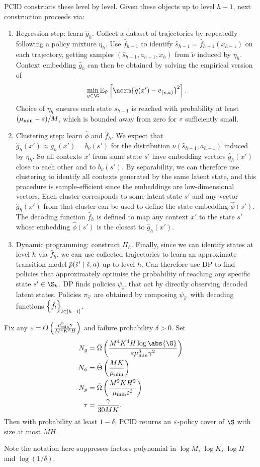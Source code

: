 \documentclass[11pt, openany]{book}
\begin{document}
PCID constructs these level by level. Given these objects up to level $h-1$, next construction proceeds via:
\begin{enumerate}
    \item Regression step: learn $\hat g_h$. Collect a dataset of trajectories by repeatedly following a policy mixture $\eta_h$. Use $\hat f_{h-1}$ to identify $\hat s_{h-1} = \hat{f}_{h-1}(x_{h-1})$ on each trajectory, getting samples $(\hat{s}_{h-1},a_{h-1},x_h)$ from $\tilde\nu$ induced by $\eta_h$. Context embedding $\hat{g}_h$ can then be obtained by solving the empirical version of
        \[
            \min_{g\in\G} \E_{\tilde\nu} \left[ \norm{g(x') - e_{(s,a)}}^2 \right].
        \]
        Choice of $\eta_h$ ensures each state $s_{h-1}$ is reached with probability at least $(\mu_{\min}-\varepsilon)/M$, which is bounded away from zero for $\varepsilon$ sufficiently small.
    \item Clustering step: learn $\hat\phi$ and $\hat f_h$. We expect that $\hat g_h(x')\approx g_h(x')=b_\nu(s')$ for the distribution $\nu(\hat s_{h-1},a_{h-1})$ induced by $\eta_h$. So all contexts $x'$ from same state $s'$ have embedding vectors $\hat g_h(x')$ close to each other and to $b_\nu(s')$. By separability, we can therefore use clustering to identify all contexts generated by the same latent state, and this procedure is sample-efficient since the embeddings are low-dimensional vectors. Each cluster corresponds to some latent state $s'$ and any vector $\hat g_h(x')$ from that cluster can be used to define the state embedding $\hat\phi(s')$. The decoding function $\hat f_h$ is defined to map any context $x'$ to the state $s'$ whose embedding $\hat\phi(s')$ is the closest to $\hat g_h(x')$.
    \item Dynamic programming: construct $\Pi_h$. Finally, since we can identify states at level $h$ via $\hat f_h$, we can use collected trajectories to learn an approximate transition model $\hat p(\hat{s}'\mid\hat s,a)$ up to level $h$. Can therefore use DP to find policies that approximately optimise the probability of reaching any specific state $s'\in\S_h$. DP finds policies $\psi_{\hat{s}'}$ that act by directly observing decoded latent states. Policies $\pi_{\hat{s}'}$ are obtained by composing $\psi_{\hat{s}'}$ with decoding functions $\left\lbrace\hat f_l\right\rbrace_{l\in[h-1]}$.
\end{enumerate}

\begin{theorem}
    Fix any $\varepsilon = O\left(\frac{\mu_{\min}^3 \gamma}{M^4 K^3 H}\right)$ and failure probability $\delta>0$. Set
    \begin{align*}
        N_g & = \tilde\Omega\left(\frac{M^4 K^4 H \log\abs{\G}}{\eps\mu_{\min}^3\gamma^2} \right) \\
            N_\phi & = \tilde\Theta\left(\frac{MK}{\mu_{\min}} \right) \\
            N_p & = \tilde\Omega\left( \frac{M^2 KH^2}{\mu_{\min}\eps^2 } \right) \\
            \tau & = \frac{\gamma}{30MK}.
    \end{align*}
    Then with probability at least $1-\delta$, PCID returns an $\varepsilon$-policy cover of $\S$ with size at most $MH$.
\end{theorem}

Note the notation here suppresses factors polynomial in $\log M$, $\log K$, $\log H$ and $\log(1/\delta)$.




\printbibliography
\end{document}
